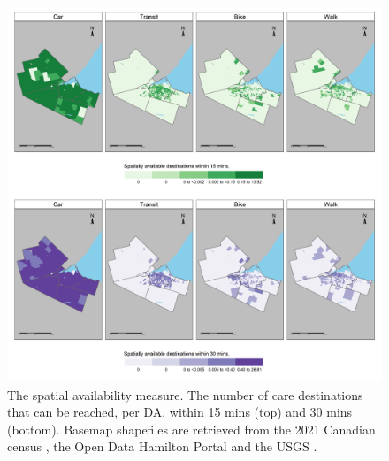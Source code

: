 \documentclass[
  super,
  preprint,
  3p]{elsarticle}
\begin{document}
\begin{figure}

{\centering \includegraphics[width=6.25in,height=\textheight]{figures/Fig6-plot_Savail_measures.png}

}

\caption{\label{fig-Fig6}The spatial availability measure. The number of
care destinations that can be reached, per DA, within 15 mins (top) and
30 mins (bottom). Basemap shapefiles are retrieved from the 2021
Canadian census \citep{governmentofcanadaCensusPopulation2023}, the Open
Data Hamilton Portal \citep{opendatahamiltonCityBoundary2023} and the
USGS \citep{greatlakesUSGS2010}.}

\end{figure}
\end{document}
